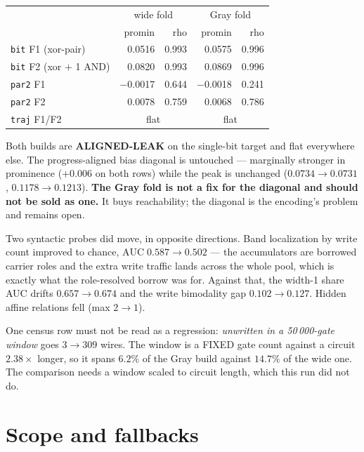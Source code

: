 \documentclass[11pt]{article}
\newcommand{\code}[1]{\texttt{#1}}
\begin{document}
\begin{center}
\begin{tabular}{lrrrr}
\toprule
 & \multicolumn{2}{c}{wide fold} & \multicolumn{2}{c}{Gray fold} \\
 & promin & rho & promin & rho \\
\midrule
\code{bit} F1 (xor-pair)      & 0.0516 & 0.993 & 0.0575 & 0.996 \\
\code{bit} F2 (xor $+$ 1 AND) & 0.0820 & 0.993 & 0.0869 & 0.996 \\
\code{par2} F1                & $-$0.0017 & 0.644 & $-$0.0018 & 0.241 \\
\code{par2} F2                & 0.0078 & 0.759 & 0.0068 & 0.786 \\
\code{traj} F1/F2             & \multicolumn{2}{c}{flat} & \multicolumn{2}{c}{flat} \\
\bottomrule
\end{tabular}
\end{center}

Both builds are \textbf{ALIGNED-LEAK} on the single-bit target and flat
everywhere else. The progress-aligned bias diagonal is untouched --- marginally
stronger in prominence ($+0.006$ on both rows) while the peak is unchanged
($0.0734 \to 0.0731$, $0.1178 \to 0.1213$). \textbf{The Gray fold is not a fix
for the diagonal and should not be sold as one.} It buys reachability; the
diagonal is the encoding's problem and remains open.

Two syntactic probes did move, in opposite directions. Band localization by
write count improved to chance, $\mathrm{AUC}\;0.587 \to 0.502$ --- the
accumulators are borrowed carrier roles and the extra write traffic lands
across the whole pool, which is exactly what the role-resolved borrow was for.
Against that, the width-1 share AUC drifts $0.657 \to 0.674$ and the write
bimodality gap $0.102 \to 0.127$. Hidden affine relations fell (max $2 \to 1$).

One census row must not be read as a regression: \emph{unwritten in a
50\,000-gate window} goes $3 \to 309$ wires. The window is a FIXED gate count
against a circuit $2.38\times$ longer, so it spans $6.2\%$ of the Gray build
against $14.7\%$ of the wide one. The comparison needs a window scaled to
circuit length, which this run did not do.

\section{Scope and fallbacks}
\end{document}

